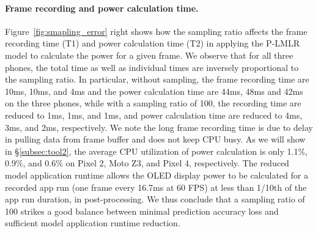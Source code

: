 \paragraph{Frame recording and power calculation time.}
Figure~\ref{fig:smapling_error} right shows how the sampling
ratio affects the frame recording time (T1) and power calculation
time (T2) in applying the P-LMLR model to
calculate the power for a given frame. 
We observe that for all three
phones, the total time as well as individual times are inversely proportional to the
sampling ratio. In particular, without sampling, the frame recording
time are 10ms, 10ms, and 4ms
and
the power calculation time are 44ms, 48ms and 42ms on
 the three phones,
while with a sampling ratio of 100, the recording time are reduced to
1ms, 1ms, and 1ms, and power calculation time are reduced to
4ms, 3ms, and 2ms, respectively.
We note the long frame recording time is due to delay in pulling data from frame buffer
and does not keep CPU busy.
As we will show in \S\ref{subsec:tool2},
the average CPU utilization of power calculation
is only 1.1\%, 0.9\%, and 0.6\% on Pixel 2, Moto Z3, and Pixel 4, respectively.
The reduced model application runtime allows the OLED display power to
be calculated for a recorded app run (one frame every 16.7ms at 60
FPS) at less than 1/10th of the app run duration, in
post-processing.
\fi
We thus conclude that a sampling ratio of 100 strikes
a good balance between minimal prediction accuracy loss and sufficient
model application runtime reduction.


